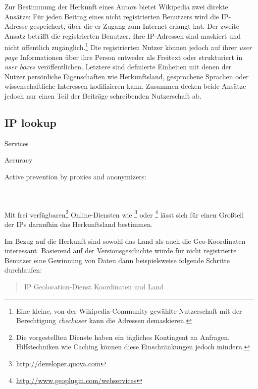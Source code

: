 Zur Bestimmung der Herkunft eines Autors bietet Wikipedia zwei direkte Ansätze: 
Für jeden Beitrag eines nicht registrierten Benutzers wird die IP-Adresse gespeichert, über die er Zugang zum Internet erlangt hat. 
Der zweite Ansatz betrifft die registrierten Benutzer.
Ihre IP-Adressen sind maskiert und nicht öffentlich zugänglich.\footnote{Eine kleine, von der Wikipedia-Community gewählte Nutzerschaft mit der Berechtigung \emph{checkuser} kann die Adressen demaskieren.}
Die registrierten Nutzer können jedoch auf ihrer \emph{user page} Informationen über ihre Person entweder als Freitext oder strukturiert in \emph{user boxes} veröffentlichen.
Letztere sind definierte Einheiten mit denen der Nutzer persönliche Eigenschaften wie Herkunftsland, gesprochene Sprachen oder wissenschaftliche Interessen kodifizieren kann.
Zusammen decken beide Ansätze jedoch nur einen Teil der Beiträge schreibenden Nutzerschaft ab.


\subsection{IP lookup}

\begin{todos}
    \item Services
    \item Accuracy
    \item Active prevention by proxies and anonymizers: 
    \\  
    \\ 
    \\ 
\end{todos}

Mit frei verfügbaren\footnote{Die vorgestellten Dienste haben ein tägliches Kontingent an Anfragen. Hilfstechniken wie Caching können diese Einschränkungen jedoch mindern.} Online-Diensten wie \footnote{\url{http://developer.quova.com}} oder \footnote{\url{http://www.geoplugin.com/webservices}} lässt sich für einen Großteil der IPs daraufhin das Herkunftsland bestimmen.

Im Bezug auf die Herkunft sind sowohl das Land als auch die Geo-Koordinaten interessant.  
Basierend auf der Versionsgeschichte würde für nicht registrierte Benutzer eine Gewinnung von Daten dann beispielsweise folgende Schritte durchlaufen:

\begin{quotation}
IP \RA Geolocation-Dienst \RA Koordinaten und Land
\end{quotation}


